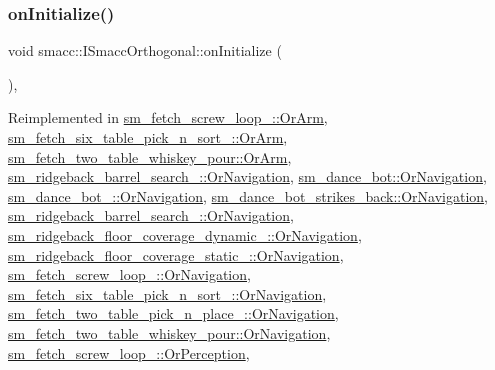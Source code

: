 \subsubsection{\texorpdfstring{on\+Initialize()}{onInitialize()}}
{\footnotesize\ttfamily void smacc\+::\+I\+Smacc\+Orthogonal\+::on\+Initialize (\begin{DoxyParamCaption}{ }\end{DoxyParamCaption})\hspace{0.3cm}{\ttfamily [protected]}, {\ttfamily [virtual]}}



Reimplemented in \hyperlink{classsm__fetch__screw__loop__1_1_1OrArm_a40a226890f6f2529a2c6e4eb291e1e5f}{sm\+\_\+fetch\+\_\+screw\+\_\+loop\+\_\+::\+Or\+Arm}, \hyperlink{classsm__fetch__six__table__pick__n__sort__1_1_1OrArm_a0cce02f6b7599e602310347cad5c3729}{sm\+\_\+fetch\+\_\+six\+\_\+table\+\_\+pick\+\_\+n\+\_\+sort\+\_\+::\+Or\+Arm}, \hyperlink{classsm__fetch__two__table__whiskey__pour_1_1OrArm_a8f222ade9f086bdba5732960ce889eeb}{sm\+\_\+fetch\+\_\+two\+\_\+table\+\_\+whiskey\+\_\+pour\+::\+Or\+Arm}, \hyperlink{classsm__ridgeback__barrel__search__1_1_1OrNavigation_ac144dc365f1d7708dfeace36b8734885}{sm\+\_\+ridgeback\+\_\+barrel\+\_\+search\+\_\+::\+Or\+Navigation}, \hyperlink{classsm__dance__bot_1_1OrNavigation_a9f87c78f5af67024c9eda25097a135ac}{sm\+\_\+dance\+\_\+bot\+::\+Or\+Navigation}, \hyperlink{classsm__dance__bot__2_1_1OrNavigation_acc491d801e0abacd9d152e048e77fab6}{sm\+\_\+dance\+\_\+bot\+\_\+::\+Or\+Navigation}, \hyperlink{classsm__dance__bot__strikes__back_1_1OrNavigation_a458a0c5fed04b9906c6943f1e7ac5bf0}{sm\+\_\+dance\+\_\+bot\+\_\+strikes\+\_\+back\+::\+Or\+Navigation}, \hyperlink{classsm__ridgeback__barrel__search__2_1_1OrNavigation_aee279dd334bda539b0a2b614ec32b95f}{sm\+\_\+ridgeback\+\_\+barrel\+\_\+search\+\_\+::\+Or\+Navigation}, \hyperlink{classsm__ridgeback__floor__coverage__dynamic__1_1_1OrNavigation_a4d090d426655e16dc668f48699d0f9c9}{sm\+\_\+ridgeback\+\_\+floor\+\_\+coverage\+\_\+dynamic\+\_\+::\+Or\+Navigation}, \hyperlink{classsm__ridgeback__floor__coverage__static__1_1_1OrNavigation_a1bb3bffac822d76afd68dfce4d93cadc}{sm\+\_\+ridgeback\+\_\+floor\+\_\+coverage\+\_\+static\+\_\+::\+Or\+Navigation}, \hyperlink{classsm__fetch__screw__loop__1_1_1OrNavigation_ad78593b6b497048ec2012a4a20f1e575}{sm\+\_\+fetch\+\_\+screw\+\_\+loop\+\_\+::\+Or\+Navigation}, \hyperlink{classsm__fetch__six__table__pick__n__sort__1_1_1OrNavigation_aa1c7c3022c02903431d88d7e34608ce1}{sm\+\_\+fetch\+\_\+six\+\_\+table\+\_\+pick\+\_\+n\+\_\+sort\+\_\+::\+Or\+Navigation}, \hyperlink{classsm__fetch__two__table__pick__n__place__1_1_1OrNavigation_aeac14b892e070c5117332111c20464f5}{sm\+\_\+fetch\+\_\+two\+\_\+table\+\_\+pick\+\_\+n\+\_\+place\+\_\+::\+Or\+Navigation}, \hyperlink{classsm__fetch__two__table__whiskey__pour_1_1OrNavigation_ab3310bc5913825e277c6f3f742192464}{sm\+\_\+fetch\+\_\+two\+\_\+table\+\_\+whiskey\+\_\+pour\+::\+Or\+Navigation}, \hyperlink{classsm__fetch__screw__loop__1_1_1OrPerception_a4c040bfe25ef00a97e2e035bf2d64915}{sm\+\_\+fetch\+\_\+screw\+\_\+loop\+\_\+::\+Or\+Perception}, 